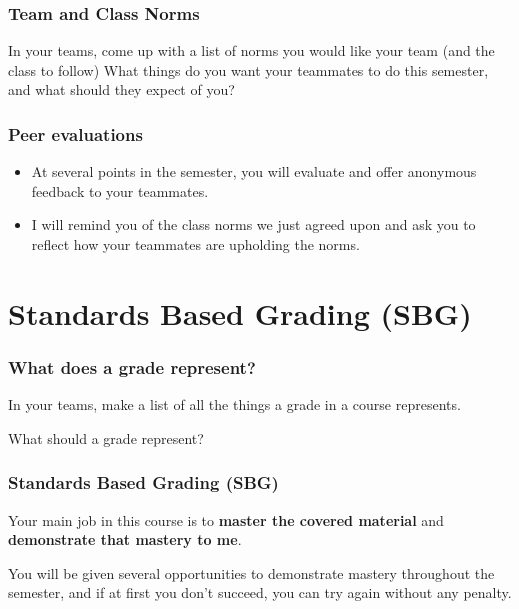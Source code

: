 \documentclass[aspectration=1610]{beamer}
\begin{document}
  

\begin{frame}\frametitle{Team and Class Norms}

In your teams, come up with a list of norms you would like your team (and the class to follow)
\vfill
What things do you want your teammates to do this semester, and what should they expect of you?
\vfill
\end{frame}

\begin{frame}\frametitle{Peer evaluations}


\begin{itemize}
\item At several points in the semester, you will evaluate and offer anonymous feedback to your teammates.
\item I will remind you of the class norms we just agreed upon and ask you to reflect how your teammates are upholding the norms.
\end{itemize}
\end{frame}

\section{Standards Based Grading (SBG)}
\begin{frame}\frametitle{What does a grade represent?}

In your teams, make a list of all the things a grade in a course represents.
\vfill

\pause
What should a grade represent?
\vfill
\end{frame}



\begin{frame}\frametitle{Standards Based Grading (SBG)}
Your main job in this course is to \textbf{master the covered material}
and \textbf{demonstrate that mastery to me}.

\vspace{0.2in}
\pause

You will be given several opportunities to demonstrate mastery throughout
the semester, and if
at first you don't succeed, you can try again without any penalty.
\end{frame}
\end{document}
